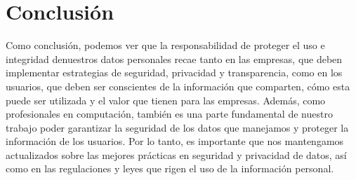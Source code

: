 \vspace{0.3cm}

\section*{Conclusión}
Como conclusión, podemos ver que la responsabilidad de proteger el uso e integridad denuestros datos personales recae
tanto en las empresas, que deben implementar estrategias de seguridad, privacidad y transparencia, como en los usuarios, que deben ser conscientes de la
información que comparten, cómo esta puede ser utilizada y el valor que tienen para las empresas.
Además, como profesionales en computación, también es una parte fundamental de nuestro trabajo poder garantizar la seguridad de los datos
que manejamos y proteger la información de los usuarios. Por lo tanto, es importante que nos mantengamos actualizados sobre las mejores prácticas 
en seguridad y privacidad de datos, así como en las regulaciones y leyes que rigen el uso de la información personal. \\






%

